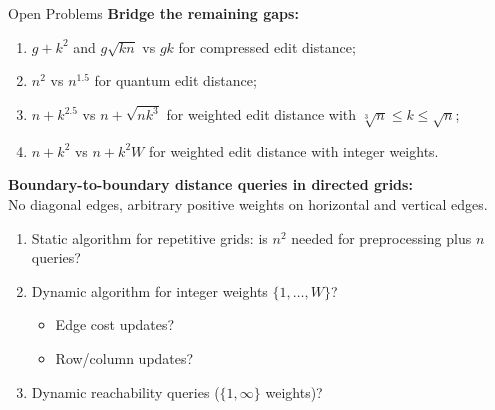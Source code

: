 \documentclass[sans-serif,aspectratio=169]{beamer}
\begin{document}
\begin{frame}{Open Problems}
    \textbf{Bridge the remaining gaps:}
    \begin{enumerate}
        \item $g+k^2$ and $g\sqrt{kn}$ vs $gk$ for compressed edit distance;
        \item $n^2$ vs $n^{1.5}$ for quantum edit distance;
        \item $n+k^{2.5}$ vs $n+\sqrt{nk^3}$ for weighted edit distance with $\sqrt[3]{n} \le k \le \sqrt{n}$;
        \item $n+k^2$ vs $n+k^2W$ for weighted edit distance with integer weights.
    \end{enumerate}

    \bigskip
    \bigskip
    \bigskip
    \pause
    \textbf{Boundary-to-boundary distance queries in directed grids:}\\
    {\footnotesize \hfill No diagonal edges, arbitrary positive weights on horizontal and vertical edges.}
    \begin{enumerate}
        \item<2-> Static algorithm for repetitive grids: is $n^2$ needed for preprocessing plus $n$ queries?
        \item<3-> Dynamic algorithm for integer weights $\{1,\ldots,W\}$? 
        \begin{itemize}
            \item Edge cost updates?
            \item Row/column updates?
        \end{itemize}
        \item<4-> Dynamic reachability queries ($\{1,\infty\}$ weights)?
    \end{enumerate}


\end{frame}
\end{document}

